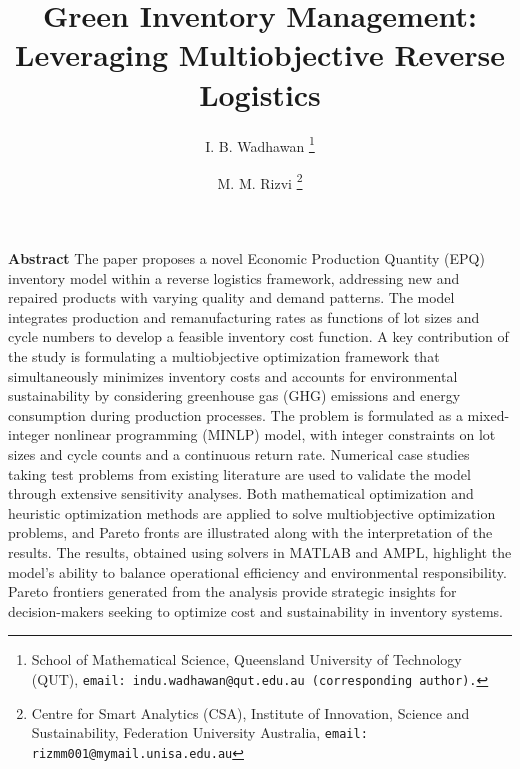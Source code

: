 \documentclass[11pt]{article}
\begin{document}
\title{\bf \Large{Green Inventory Management: Leveraging Multiobjective Reverse Logistics}}

 \author{I. B. Wadhawan \thanks{School of Mathematical Science, Queensland University of Technology (QUT), 
 {\tt email: indu.wadhawan@qut.edu.au (corresponding author).}}
 \and
 M. M. Rizvi \thanks{Centre for Smart Analytics (CSA), Institute of Innovation, Science and Sustainability, Federation University Australia, {\tt email:  rizmm001@mymail.unisa.edu.au}}
  }
\maketitle
\textbf{Abstract} The paper proposes a novel Economic Production Quantity (EPQ) inventory model within a reverse logistics framework, addressing new and repaired products with varying quality and demand patterns. The model integrates production and remanufacturing rates as functions of lot sizes and cycle numbers to develop a feasible inventory cost function. A key contribution of the study is formulating a multiobjective optimization framework that simultaneously minimizes inventory costs and accounts for environmental sustainability by considering greenhouse gas (GHG) emissions and energy consumption during production processes. The problem is formulated as a mixed-integer nonlinear programming (MINLP) model, with integer constraints on lot sizes and cycle counts and a continuous return rate. Numerical case studies taking test problems from existing literature are used to validate the model through extensive sensitivity analyses. Both mathematical optimization and heuristic optimization methods are applied to solve multiobjective optimization problems, and Pareto fronts are illustrated along with the interpretation of the results. The results, obtained using solvers in MATLAB and AMPL, highlight the model’s ability to balance operational efficiency and environmental responsibility. Pareto frontiers generated from the analysis provide strategic insights for decision-makers seeking to optimize cost and sustainability in inventory systems.
\end{document}
